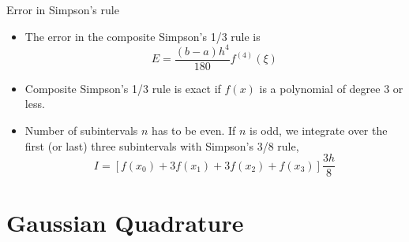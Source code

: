 \documentclass{beamer}
\begin{document}
\begin{frame}{Error in Simpson's rule}
\begin{itemize}
\item The error in the composite Simpson's 1/3 rule is 
\[
E=\frac{(b-a)h^4}{180} f^{(4)}(\xi)
\]
\item Composite Simpson's 1/3 rule is \alert{exact} if $f(x)$ is a polynomial of degree 3 or less.
\item Number of subintervals $n$ has to be even. If $n$ is odd, we integrate over the first (or last) three subintervals with \alert{Simpson's 3/8 rule},
\[
I=[f(x_0)+3f(x_1)+3f(x_2)+f(x_3)]\frac{3h}{8}
\] 
\end{itemize}
\end{frame}
\section[Gaussian Quadrature]{Gaussian Quadrature}
\end{document}
